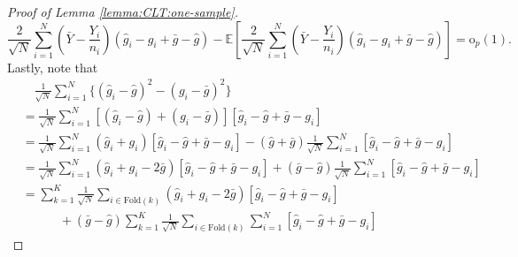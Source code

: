 \documentclass[12pt,letterpaper]{article}
\begin{document}
\begin{proof}[Proof of Lemma \ref{lemma:CLT:one-sample}]
\begin{equation}\label{eq:vanish:cross:Y:g}
    \frac{2}{\sqrt{N}}\sum_{i=1}^N\left(\bar{Y}-\frac{Y_i}{n_i}\right)(\hat{g}_i-g_i+\bar{g}-\hat{g})-\mathbb{E}\left[\frac{2}{\sqrt{N}}\sum_{i=1}^N\left(\bar{Y}-\frac{Y_i}{n_i}\right)(\hat{g}_i-g_i+\bar{g}-\hat{g})\right]=\mathrm{o}_p(1).
\end{equation}
Lastly, note that 
\begin{equation}\label{eq:g:square:diff}
\begin{array}{rl}
    &\quad\displaystyle\frac{1}{\sqrt{N}}\sum_{i=1}^N\{(\hat{g}_i-\hat{g})^2-(g_i-\bar{g})^2\}\\
    &\displaystyle=\frac{1}{\sqrt{N}}\sum_{i=1}^N[(\hat{g}_i-\hat{g})+(g_i-\bar{g})][\hat{g}_i-\hat{g}+\bar{g}-g_i]\\
    &\displaystyle=\frac{1}{\sqrt{N}}\sum_{i=1}^N(\hat{g}_i+g_i)[\hat{g}_i-\hat{g}+\bar{g}-g_i]-(\hat{g}+\bar{g})\frac{1}{\sqrt{N}}\sum_{i=1}^N[\hat{g}_i-\hat{g}+\bar{g}-g_i]\\
    &\displaystyle=\frac{1}{\sqrt{N}}\sum_{i=1}^N(\hat{g}_i+g_i-2\bar{g})[\hat{g}_i-\hat{g}+\bar{g}-g_i]+(\bar{g}-\hat{g})\frac{1}{\sqrt{N}}\sum_{i=1}^N[\hat{g}_i-\hat{g}+\bar{g}-g_i]\\
    &\displaystyle=\sum_{k=1}^K\frac{1}{\sqrt{N}}\sum_{i\in\textrm{Fold}(k)}(\hat{g}_i+g_i-2\bar{g})[\hat{g}_i-\hat{g}+\bar{g}-g_i]\\
    &\displaystyle\quad\quad\quad+(\bar{g}-\hat{g})\sum_{k=1}^K\frac{1}{\sqrt{N}}\sum_{i\in\textrm{Fold}(k)}\sum_{i=1}^N[\hat{g}_i-\hat{g}+\bar{g}-g_i]
\end{array}
\end{equation}

\end{proof}
\end{document}
